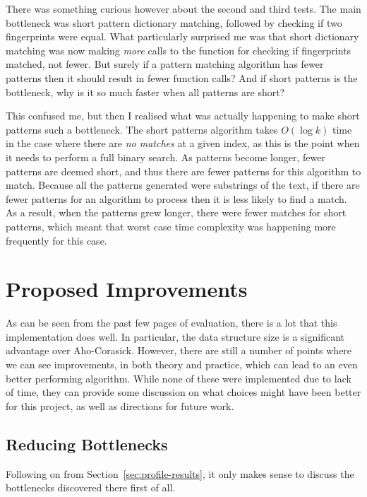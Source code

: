 \documentclass[ %
                    author={Dominic Joseph Moylett},
                    degree={MEng},
                     title={Dictionary Matching with Fingerprints},
                  subtitle={An Empirical Analysis},
                      type={research},
                      year={2015} ]{dissertation}
\begin{document}
There was something curious however about the second and third tests. The main bottleneck was short pattern dictionary matching, followed by checking if two fingerprints were equal. What particularly surprised me was that short dictionary matching was now making \textit{more} calls to the function for checking if fingerprints matched, not fewer. But surely if a pattern matching algorithm has fewer patterns then it should result in fewer function calls? And if short patterns is the bottleneck, why is it so much faster when all patterns are short?

This confused me, but then I realised what was actually happening to make short patterns such a bottleneck. The short patterns algorithm takes $O(\log k)$ time in the case where there are \textit{no matches} at a given index, as this is the point when it needs to perform a full binary search. As patterns become longer, fewer patterns are deemed short, and thus there are fewer patterns for this algorithm to match. Because all the patterns generated were substrings of the text, if there are fewer patterns for an algorithm to process then it is less likely to find a match. As a result, when the patterns grew longer, there were fewer matches for short patterns, which meant that worst case time complexity was happening more frequently for this case.

\section{Proposed Improvements}

As can be seen from the past few pages of evaluation, there is a lot that this implementation does well. In particular, the data structure size is a significant advantage over Aho-Corasick. However, there are still a number of points where we can see improvements, in both theory and practice, which can lead to an even better performing algorithm. While none of these were implemented due to lack of time, they can provide some discussion on what choices might have been better for this project, as well as directions for future work.

\subsection{Reducing Bottlenecks}
\label{sec:reduce-bottle}

Following on from Section~\ref{sec:profile-results}, it only makes sense to discuss the bottlenecks discovered there first of all.
\end{document}
